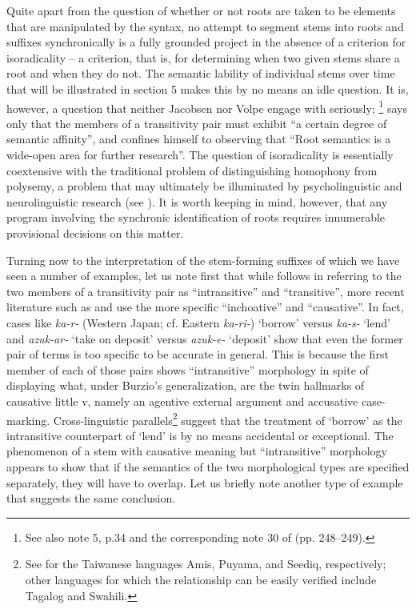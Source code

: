 \documentclass[output=paper,
modfonts
]{LSP/langsci}
\begin{document}
Quite apart from the question of whether or not roots are taken to be
elements that are manipulated by the syntax, no attempt to segment stems
into roots and suffixes synchronically is a fully grounded project in
the absence of a criterion for isoradicality -- a criterion, that is, for
determining when two given stems share a root and when they do not. The
semantic lability of individual stems over time that will be illustrated
in section 5 makes this by no means an idle question. It is, however, a
question that neither Jacobsen nor Volpe engage with seriously; \citet[38]{jacobsen1982a}\footnote{See also note 5, p.34 and the corresponding note 30 of
  \citealt{jacobsen1992a} (pp. 248--249).} says only that the members of a transitivity
pair must exhibit ``a certain degree of semantic affinity'', and \citet[32]{volpe2005a} confines himself to observing that ``Root semantics is a
wide-open area for further research''. The question of isoradicality is
essentially coextensive with the traditional problem of distinguishing
homophony from polysemy, a problem that may ultimately be illuminated by
psycholinguistic and neurolinguistic research (see \citealt[103]{marantz2013a}). It
is worth keeping in mind, however, that any program involving the
synchronic identification of roots requires innumerable provisional
decisions on this matter.

Turning now to the interpretation of the stem-forming suffixes of which
we have seen a number of examples, let us note first that while \citet{volpe2005a} follows \citet{jacobsen1982a,jacobsen1992a} in referring to the two members of
a transitivity pair as ``intransitive'' and ``transitive'', more recent
literature such as \citet{harley2008a,harley2012a} and \citet{marantz2013a} use the more
specific ``inchoative'' and ``causative''. In fact, cases like
\textit{ka-r-} (Western Japan; cf. Eastern \textit{ka-ri-}) `borrow' versus
\textit{ka-s-} `lend' and \textit{azuk-ar-} `take on deposit' versus
\textit{azuk-e-} `deposit' show that even the former pair of terms is too
specific to be accurate in general. This is because the first member of
each of those pairs shows ``intransitive'' morphology in spite of
displaying what, under Burzio's generalization, are the twin hallmarks
of causative little v, namely an agentive external argument and
accusative case-marking. Cross-linguistic parallels\footnote{See \citet[59, 84--85, 107]{kuo2015a} for the Taiwanese languages Amis, Puyama, and Seediq, respectively; other languages for which the relationship can
  be easily verified include Tagalog and Swahili.} suggest that the
treatment of `borrow' as the intransitive counterpart of `lend' is by no
means accidental or exceptional. The phenomenon of a stem with causative
meaning but ``intransitive'' morphology appears to show that if the
semantics of the two morphological types are specified separately, they
will have to overlap. Let us briefly note another type of example that
suggests the same conclusion.
\end{document}
